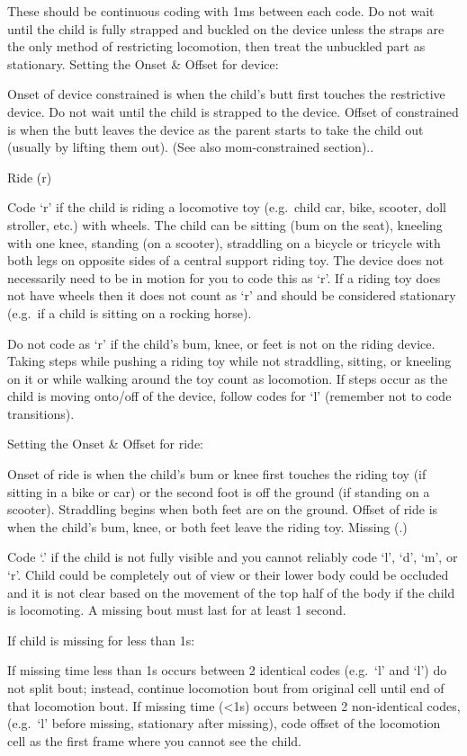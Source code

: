 \documentclass[
]{book}
\begin{document}
These should be continuous coding with 1ms between each code. Do not wait until the child is fully strapped and buckled on the device unless the straps are the only method of restricting locomotion, then treat the unbuckled part as stationary.
Setting the Onset \& Offset for device:

Onset of device constrained is when the child's butt first touches the restrictive device. Do not wait until the child is strapped to the device.
Offset of constrained is when the butt leaves the device as the parent starts to take the child out (usually by lifting them out). (See also mom-constrained section)..

Ride (r)

Code `r' if the child is riding a locomotive toy (e.g.~child car, bike, scooter, doll stroller, etc.) with wheels. The child can be sitting (bum on the seat), kneeling with one knee, standing (on a scooter), straddling on a bicycle or tricycle with both legs on opposite sides of a central support riding toy. The device does not necessarily need to be in motion for you to code this as `r'. If a riding toy does not have wheels then it does not count as `r' and should be considered stationary (e.g.~if a child is sitting on a rocking horse).

Do not code as `r' if the child's bum, knee, or feet is not on the riding device. Taking steps while pushing a riding toy while not straddling, sitting, or kneeling on it or while walking around the toy count as locomotion. If steps occur as the child is moving onto/off of the device, follow codes for `l' (remember not to code transitions).

Setting the Onset \& Offset for ride:

Onset of ride is when the child's bum or knee first touches the riding toy (if sitting in a bike or car) or the second foot is off the ground (if standing on a scooter). Straddling begins when both feet are on the ground.
Offset of ride is when the child's bum, knee, or both feet leave the riding toy.
Missing (.)

Code `.' if the child is not fully visible and you cannot reliably code `l', `d', `m', or `r'. Child could be completely out of view or their lower body could be occluded and it is not clear based on the movement of the top half of the body if the child is locomoting. A missing bout must last for at least 1 second.

If child is missing for less than 1s:

If missing time less than 1s occurs between 2 identical codes (e.g.~`l' and `l') do not split bout; instead, continue locomotion bout from original cell until end of that locomotion bout.
If missing time (\textless1s) occurs between 2 non-identical codes, (e.g.~`l' before missing, stationary after missing), code offset of the locomotion cell as the first frame where you cannot see the child.
\end{document}
